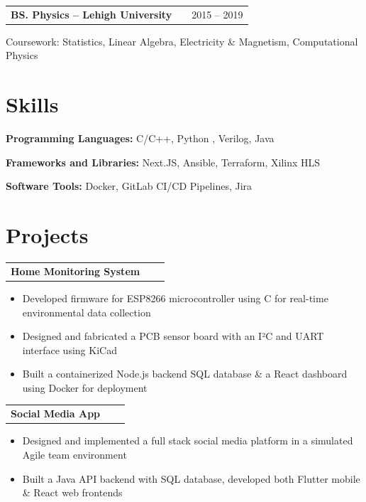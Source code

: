 \documentclass[letter,12pt]{article}
\makeatletter
\newenvironment{jobshort}[2]
    {
    \begin{tabularx}{\linewidth}{@{}l X r@{}}
    \textbf{#1} & \hfill &  #2 \\[3.75pt]
    \end{tabularx}
    }
    {
    }
\newenvironment{joblong}[2]
    {
    \begin{tabularx}{\linewidth}{@{}l X r@{}}
    \textbf{#1} & \hfill &  #2 \\[3.75pt]
    \end{tabularx}
    \begin{minipage}[t]{\linewidth}
    \begin{itemize}[leftmargin=1em, label=--]
    }
    {
    \end{itemize}
    \end{minipage}    
    }
\makeatother
\begin{document}
\begin{jobshort}{BS. Physics -- Lehigh University}{2015 -- 2019}
\small Coursework: Statistics, Linear Algebra, Electricity \& Magnetism, Computational Physics
\end{jobshort}

\section{Skills}

\textbf{Programming Languages:} C/C++, Python , Verilog, Java

\textbf{Frameworks and Libraries:} Next.JS, Ansible, Terraform, Xilinx HLS

\textbf{Software Tools:} Docker, GitLab CI/CD Pipelines, Jira



\section{Projects}

\begin{joblong}{Home Monitoring System}{}
    \item Developed firmware for ESP8266 microcontroller using C for real-time environmental data collection
    \item Designed and fabricated a PCB sensor board with an I²C and UART interface using KiCad
    \item Built a containerized Node.js backend SQL database \& a React dashboard using Docker for deployment
\end{joblong}

\begin{joblong}{Social Media App}{}
    \item Designed and implemented a full stack social media platform in a simulated Agile team environment
    \item Built a Java API backend with SQL database, developed both Flutter mobile \& React web frontends
\end{joblong}
\end{document}
